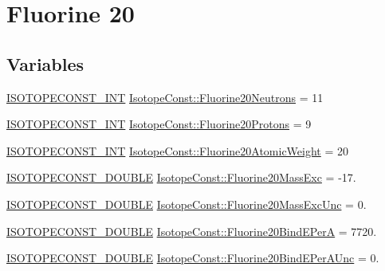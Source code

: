 \hypertarget{group___isotope_const-_fluorine-_f20}{}\section{Fluorine 20}
\label{group___isotope_const-_fluorine-_f20}
\subsection*{Variables}
\begin{DoxyCompactItemize}
\item 
\mbox{\hyperlink{group___isotope_const-_macros_ga5f18360b3e99483a35c32d789e62621c}{I\+S\+O\+T\+O\+P\+E\+C\+O\+N\+S\+T\+\_\+\+I\+NT}} \mbox{\hyperlink{group___isotope_const-_fluorine-_f20_ga6b72dc685497404223c9134f4d571e35}{Isotope\+Const\+::\+Fluorine20\+Neutrons}} = 11
\item 
\mbox{\hyperlink{group___isotope_const-_macros_ga5f18360b3e99483a35c32d789e62621c}{I\+S\+O\+T\+O\+P\+E\+C\+O\+N\+S\+T\+\_\+\+I\+NT}} \mbox{\hyperlink{group___isotope_const-_fluorine-_f20_ga573e954e1849eb2dbb5309ea96e79e63}{Isotope\+Const\+::\+Fluorine20\+Protons}} = 9
\item 
\mbox{\hyperlink{group___isotope_const-_macros_ga5f18360b3e99483a35c32d789e62621c}{I\+S\+O\+T\+O\+P\+E\+C\+O\+N\+S\+T\+\_\+\+I\+NT}} \mbox{\hyperlink{group___isotope_const-_fluorine-_f20_ga171b2b590fb7875bfb108a7ea2884d78}{Isotope\+Const\+::\+Fluorine20\+Atomic\+Weight}} = 20
\item 
\mbox{\hyperlink{group___isotope_const-_macros_ga8f45a7272ce02c0b4c65c44636ed719a}{I\+S\+O\+T\+O\+P\+E\+C\+O\+N\+S\+T\+\_\+\+D\+O\+U\+B\+LE}} \mbox{\hyperlink{group___isotope_const-_fluorine-_f20_ga64a92786d8d6db92098745da01959784}{Isotope\+Const\+::\+Fluorine20\+Mass\+Exc}} = -\/17.
\item 
\mbox{\hyperlink{group___isotope_const-_macros_ga8f45a7272ce02c0b4c65c44636ed719a}{I\+S\+O\+T\+O\+P\+E\+C\+O\+N\+S\+T\+\_\+\+D\+O\+U\+B\+LE}} \mbox{\hyperlink{group___isotope_const-_fluorine-_f20_ga5678fbb8dd304534d3f527d4feaaae8a}{Isotope\+Const\+::\+Fluorine20\+Mass\+Exc\+Unc}} = 0.
\item 
\mbox{\hyperlink{group___isotope_const-_macros_ga8f45a7272ce02c0b4c65c44636ed719a}{I\+S\+O\+T\+O\+P\+E\+C\+O\+N\+S\+T\+\_\+\+D\+O\+U\+B\+LE}} \mbox{\hyperlink{group___isotope_const-_fluorine-_f20_gac43449c174431c6bf0924f19d6c88fe9}{Isotope\+Const\+::\+Fluorine20\+Bind\+E\+PerA}} = 7720.
\item 
\mbox{\hyperlink{group___isotope_const-_macros_ga8f45a7272ce02c0b4c65c44636ed719a}{I\+S\+O\+T\+O\+P\+E\+C\+O\+N\+S\+T\+\_\+\+D\+O\+U\+B\+LE}} \mbox{\hyperlink{group___isotope_const-_fluorine-_f20_ga00726d6fa91020ea80b1b63e979020de}{Isotope\+Const\+::\+Fluorine20\+Bind\+E\+Per\+A\+Unc}} = 0.

\end{DoxyCompactItemize}
